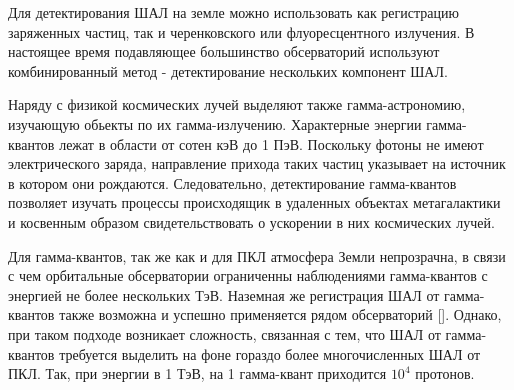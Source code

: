 
Для детектирования ШАЛ на земле можно использовать как регистрацию заряженных частиц, так и черенковского или флуоресцентного излучения. В настоящее время подавляющее большинство обсерваторий используют комбинированный метод - детектирование нескольких компонент ШАЛ.

Наряду с физикой космических лучей выделяют также гамма-астрономию, изучающую обьекты по их гамма-излучению. Характерные энергии гамма-квантов лежат в области от сотен кэВ до 1 ПэВ. Поскольку фотоны не имеют электрического заряда, направление прихода таких частиц указывает на источник в котором они рождаются. Следовательно, детектирование гамма-квантов позволяет изучать процессы происходящик в удаленных объектах метагалактики и косвенным образом свидетельствовать о ускорении в них космических лучей.

Для гамма-квантов, так же как и для ПКЛ атмосфера Земли непрозрачна, в связи с чем орбитальные обсерватории ограниченны наблюдениями гамма-квантов с энергией не более нескольких ТэВ. Наземная же регистрация ШАЛ от гамма-квантов также возможна и успешно применяется рядом обсерваторий []. Однако, при таком подходе возникает сложность, связанная с тем, что ШАЛ от гамма-квантов требуется выделить на фоне гораздо более многочисленных ШАЛ от ПКЛ. Так, при энергии в 1 ТэВ, на 1 гамма-квант приходится $10^4$ протонов.

